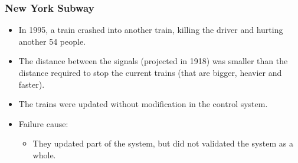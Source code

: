\begin{frame}[hasprev=false, hasnext=false]
\frametitle{New York Subway}
\label{example:new-york-subway}

\begin{itemize}
	\item In 1995, a train crashed into another train, killing the driver and
	hurting another 54 people.

	\item The distance between the signals (projected in 1918) was smaller than
	the distance required to stop the current trains (that are bigger, heavier
	and faster).

	\item The trains were updated without modification in the control system.

	\item Failure cause:
	\begin{itemize}
		\item They updated part of the system, but did not validated the system
		as a whole.
	\end{itemize}
\end{itemize}
\end{frame}



